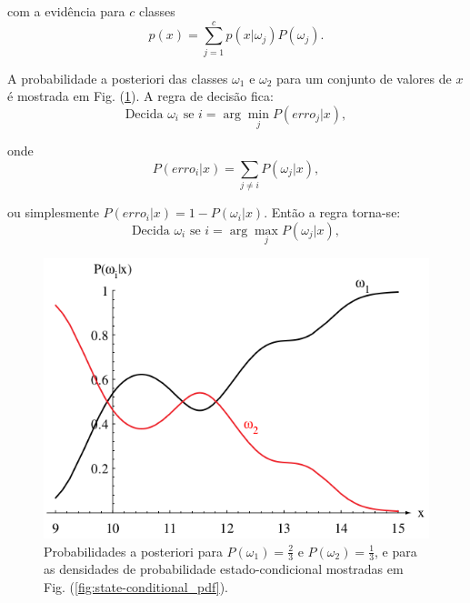 \documentclass[a4paper,12pt,twocolumn]{article}
\newcommand{\figureref}[1]{Fig. (\ref{fig:#1})}
\begin{document}
\noindent com a evidência para $c$ classes
\begin{equation}
    p(x) = \sum_{j=1}^c p(x|\omega_j)P(\omega_j).
    \label{eq:bayes}
\end{equation}

A probabilidade a posteriori das classes $\omega_1$ e $\omega_2$ para um conjunto de valores de $x$ é mostrada em \figureref{posteriori_prob}. A regra de decisão fica:
\begin{equation}
    \text{Decida } \omega_i \text{ se } i = \arg\min_j P(erro_j|x),
    \label{eq:decision_2}
\end{equation}

\noindent onde
\begin{equation}
    P(erro_i|x) = \sum_{j\neq i} P(\omega_j|x),
    \label{eq:bayes}
\end{equation}

\noindent ou simplesmente $P(erro_i|x) = 1 - P(\omega_i|x)$. Então a regra torna-se:
\begin{equation}
    \text{Decida } \omega_i \text{ se } i = \arg\max_j P(\omega_j|x),
    \label{eq:decision_3}
\end{equation}

\begin{figure}[ht]
    \centering
    \includegraphics[width=\columnwidth]{posteriori_prob}
    \caption{Probabilidades a posteriori para $P(\omega_1) = \frac{2}{3}$ e $P(\omega_2) = \frac{1}{3}$, e para as densidades de probabilidade estado-condicional mostradas em \figureref{state-conditional_pdf}.}
    \label{fig:posteriori_prob}
\end{figure}
\end{document}
